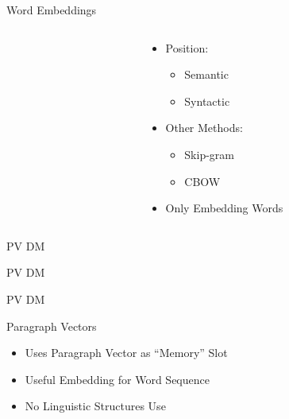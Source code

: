 \documentclass[12pt,landscape,english]{beamer}
\begin{document}
\begin{frame}{Word Embeddings}
	\begin{columns}
		\begin{column}{0.5\textwidth}
			\centering\resizebox{\textwidth}{!}{
			
			}
		\end{column}
		\begin{column}{0.5\textwidth}
			\begin{itemize}
				\item Position:
					\begin{itemize}
						\item Semantic
						\item Syntactic						
					\end{itemize}						
				\item Other Methods:
				\begin{itemize}
					\item Skip-gram
					\item CBOW					
				\end{itemize}	
				\item Only Embedding Words			
			\end{itemize}		
		\end{column}
	\end{columns}
\end{frame}

\begin{frame} {PV DM} 
	\hskip-1cm
	\resizebox{!}{0.7\textheight}{}
\end{frame}


\begin{frame} {PV DM} 
	\hskip-1cm
	\resizebox{!}{0.7\textheight}{}
\end{frame}


\begin{frame} {PV DM}
	\hskip-1cm
	\resizebox{!}{0.7\textheight}{}
	
\end{frame}

\begin{frame} {Paragraph Vectors}
	\centering\resizebox{!}{0.4\textheight}{}
	\begin{itemize}
		\item Uses Paragraph Vector as ``Memory'' Slot
		\item Useful Embedding for Word Sequence
		\item No Linguistic Structures Use
	\end{itemize}	

\end{frame}
	
\end{document}
